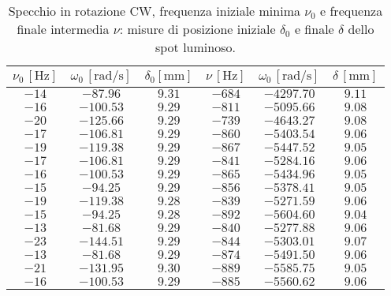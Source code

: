 \documentclass[]{article}
\begin{document}
    \begin {table}
        \centering
         \begin{tabular}{||c|c|c||c|c|c||}
            \hline
            $\nu_0\, [\text{Hz}] $ & $\omega_0\, [\text{rad/s}] $ & $\delta_0 [\text{mm}] $ & $\nu\, [\text{Hz}] $ & $\omega_0\, [\text{rad/s}] $ & $\delta\, [\text{mm}] $ \\
            \hline\hline
            $-14$ & $-87.96  $ & $9.31$ & $-684$ & $-4297.70$ & $9.11$\\\hline
            $-16$ & $-100.53 $ & $9.29$ & $-811$ & $-5095.66$ & $9.08$\\\hline
            $-20$ & $-125.66 $ & $9.29$ & $-739$ & $-4643.27$ & $9.08$\\\hline
            $-17$ & $-106.81 $ & $9.29$ & $-860$ & $-5403.54$ & $9.06$\\\hline
            $-19$ & $-119.38 $ & $9.29$ & $-867$ & $-5447.52$ & $9.05$\\\hline
            $-17$ & $-106.81 $ & $9.29$ & $-841$ & $-5284.16$ & $9.06$\\\hline
            $-16$ & $-100.53 $ & $9.29$ & $-865$ & $-5434.96$ & $9.05$\\\hline
            $-15$ & $-94.25  $ & $9.29$ & $-856$ & $-5378.41$ & $9.05$\\\hline
            $-19$ & $-119.38 $ & $9.28$ & $-839$ & $-5271.59$ & $9.06$\\\hline
            $-15$ & $-94.25  $ & $9.28$ & $-892$ & $-5604.60$ & $9.04$\\\hline
            $-13$ & $-81.68  $ & $9.29$ & $-840$ & $-5277.88$ & $9.06$\\\hline
            $-23$ & $-144.51 $ & $9.29$ & $-844$ & $-5303.01$ & $9.07$\\\hline
            $-13$ & $-81.68  $ & $9.29$ & $-874$ & $-5491.50$ & $9.06$\\\hline
            $-21$ & $-131.95 $ & $9.30$ & $-889$ & $-5585.75$ & $9.05$\\\hline
            $-16$ & $-100.53 $ & $9.29$ & $-885$ & $-5560.62$ & $9.06$\\\hline
        \end{tabular}
        \caption{Specchio in rotazione CW, frequenza iniziale minima $\nu_0$ e frequenza finale intermedia $\nu$: misure di posizione iniziale $\delta_0$ e finale $\delta$ dello spot luminoso.}
        \label{CW_min_mid-delta-omega}
    \end{table}
\end{document}
